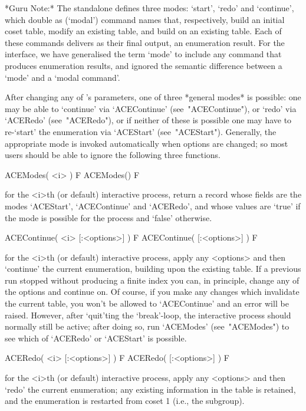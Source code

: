 *Guru Note:*
The  {\ACE}  standalone  defines  three  modes:  `start',  `redo'  and
`continue',  which  double  as  (\lq{}modal')  command   names   that,
respectively, build an initial coset table, modify an existing  table,
and build on an existing table. Each of  these  commands  delivers  as
their final output, an enumeration result. For the  {\ACE}  interface,
we have generalised the term \lq{}mode' to include  any  command  that
produces enumeration results,  and  ignored  the  semantic  difference
between a \lq{}mode' and a \lq{}modal command'.

After changing any of  {\ACE}'s  parameters,  one  of  three  *general
modes*  is  possible:  one  may  be   able   to   \lq{}continue'   via
`ACEContinue'  (see~"ACEContinue"),  or   \lq{}redo'   via   `ACERedo'
(see~"ACERedo"), or if neither of these is possible one  may  have  to
re-\lq{}start'  the  enumeration  via   `ACEStart'   (see~"ACEStart").
Generally, the appropriate mode is invoked automatically when  options
are changed; so most users should be  able  to  ignore  the  following
three functions.

\beginitems

\>ACEModes( <i> ) F
\>ACEModes() F

for the <i>th (or default) interactive {\ACE} process, return a record
whose fields are the modes `ACEStart',  `ACEContinue'  and  `ACERedo',
and whose values are `true' if the mode is possible  for  the  process
and `false' otherwise.

\>ACEContinue( <i> [:<options>] ) F
\>ACEContinue( [:<options>] ) F

for the <i>th (or  default)  interactive  {\ACE}  process,  apply  any
<options> and then \lq{}continue' the  current  enumeration,  building
upon the existing table. If a previous run stopped without producing a
finite index you can, in principle, change  any  of  the  options  and
continue on. Of course, if you make any changes which  invalidate  the
current table, you won't be allowed to `ACEContinue' and an error will
be raised. However, after `quit'ting the `break'-loop, the interactive
{\ACE} process should normally still be active; after  doing  so,  run
`ACEModes' (see~"ACEModes") to see which of `ACERedo' or `ACEStart' is
possible.

\>ACERedo( <i> [:<options>] ) F
\>ACERedo( [:<options>] ) F

for the <i>th (or  default)  interactive  {\ACE}  process,  apply  any
<options> and then \lq{}redo' the current  enumeration;  any  existing
information in the table is retained, and the enumeration is restarted
from coset 1 (i.e., the subgroup).

